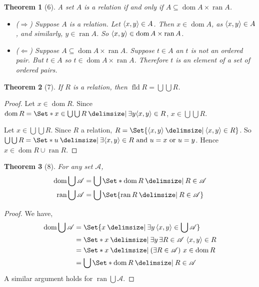 \documentclass[12pt]{article}
\theoremstyle{plain}
\newtheorem*{exthm}{Theorem}
\theoremstyle{remark}
\theoremstyle{definition}
\theoremstyle{remark}
\providecommand\st{}
\newcommand\SetSymbol[1][]{%
  \nonscript\:#1\vert%
  \allowbreak%
  \nonscript\:
\mathopen{}}
\DeclarePairedDelimiter{\ang}{\langle}{\rangle}
\renewcommand\st{\SetSymbol[\delimsize]}
\DeclareMathOperator{\dom}{dom}
\DeclareMathOperator{\ran}{ran}
\DeclareMathOperator{\fld}{fld}
\begin{document}
\begin{exthm}[6]
  A set $A$ is a relation if and only if $A \subseteq \dom{A} \times \ran{A}$.
  \begin{itemize}
    \item ($\Rightarrow$) Suppose $A$ is a relation. Let $\ang{x,y} \in A$. Then $x \in \dom{A}$, as $\ang{x,y} \in A$, and similarly, $y \in \ran{A}$. So $\ang{x,y} \in \dom{A} \times \ran{A}$.
    \item ($\Leftarrow$) Suppose $A \subseteq \dom{A} \times \ran{A}$. Suppose $t \in A$ an $t$ is not an ordered pair. But $t \in A$ so $t \in \dom{A} \times \ran{A}$. Therefore $t$ is an element of a set of ordered pairs.
  \end{itemize}
\end{exthm}

\begin{exthm}[7]
  If $R$ is a relation, then $\fld{R} = \bigcup\bigcup R$.
\end{exthm}
\begin{proof}
  Let $x \in \dom{R}$. Since $\dom{R} = \Set*{x \in \bigcup\bigcup R \st \exists y \ang{x,y} \in R}$, $x \in \bigcup\bigcup R$.

  Let $x \in \bigcup\bigcup R$. Since $R$ a relation, $R = \Set{\ang{x, y} \st \ang{x,y} \in R}$. So $\bigcup \bigcup R = \Set*{u \st \exists \ang{x,y} \in R \text{ and } u = x \text{ or } u = y}$. Hence $x \in \dom{R} \cup \ran{R}$.
\end{proof}

\begin{exthm}[8]
  For any set $\mathscr{A}$,
  \begin{align*}
    \dom{\bigcup \mathscr{A}} &= \bigcup \Set*{\dom{R} \st R \in \mathscr{A}}\\
    \ran{\bigcup \mathscr{A}} &= \bigcup \Set{\ran{R} \st R \in \mathscr{A}}
  \end{align*}
\end{exthm}
\begin{proof}
  We have,
  \begin{align*}
    \dom{\bigcup \mathscr{A}} &= \Set{x \st \exists y\, \ang{x, y} \in \bigcup \mathscr{A}}\\
                              &= \Set*{x \st \exists y\, \exists R \in \mathscr{A}\ \ang{x,y} \in R}\\
                              &= \Set*{x \st (\exists R \in \mathscr{A})\ x \in \dom{R}}\\
                              &= \bigcup \Set*{\dom{R} \st R \in \mathscr{A}}
  \end{align*}
  A similar argument holds for $\ran \bigcup \mathscr{A}$.
\end{proof}
\end{document}
